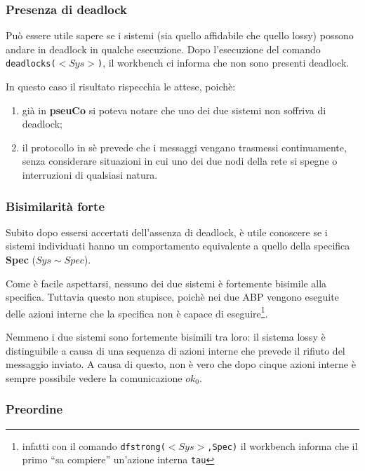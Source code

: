 \subsubsection{Presenza di deadlock}

Può essere utile sapere se i sistemi (sia quello affidabile che quello lossy)
possono andare in deadlock in qualche esecuzione. Dopo l'esecuzione del comando
\texttt{deadlocks(}$<Sys>$\texttt{)}, il workbench ci informa che non sono
presenti deadlock.

In questo caso il risultato rispecchia le attese, poichè:

\begin{enumerate}
  \item già in \textbf{pseuCo} si poteva notare che uno dei due sistemi non
    soffriva di deadlock;
  \item il protocollo in sè prevede che i messaggi vengano trasmessi
    continuamente, senza considerare situazioni in cui uno dei due nodi
    della rete si spegne o interruzioni di qualsiasi natura.
\end{enumerate}

\subsubsection{Bisimilarità forte}

Subito dopo essersi accertati dell'assenza di deadlock, è utile conoscere se i
sistemi individuati hanno un comportamento equivalente a quello della
specifica \textbf{Spec} ($Sys \sim Spec$).

Come è facile aspettarsi, nessuno dei due sistemi è fortemente bisimile alla
specifica. Tuttavia questo non stupisce, poichè nei due ABP vengono eseguite
delle azioni interne che la specifica non è capace di
eseguire\footnote{infatti con il comando
\texttt{dfstrong(}$<Sys>$\texttt{,Spec)} il workbench informa che il primo
``sa compiere'' un'azione interna \texttt{tau}}.

Nemmeno i due sistemi sono fortemente bisimili tra loro: il sistema lossy è
distinguibile a causa di una sequenza di azioni interne che prevede il rifiuto
del messaggio inviato. A causa di questo, non è vero che dopo cinque azioni
interne è sempre possibile vedere la comunicazione \texttt{$ok_0$}.

\subsubsection{Preordine}

